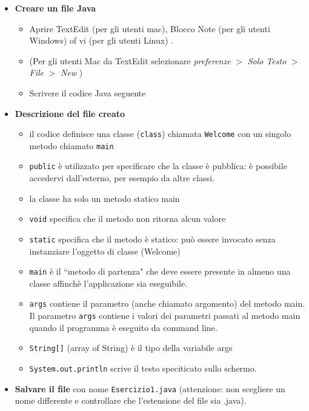 \documentclass{article}
\theoremstyle{definition}
\begin{document}
\begin{itemize}
\item \textbf{Creare un file Java}
\begin{itemize}
\item Aprire  TextEdit (per gli utenti mac), Blocco Note (per gli utenti Windows) of vi (per gli utenti Linux) .
\item (Per gli utenti Mac da TextEdit selezionare \textit{preferenze} $>$ \textit{Solo Testo} $>$ \textit{File} $>$ \textit{New} )
\item Scrivere il codice  Java seguente
\end{itemize}
\end{itemize}

\begin{itemize}
\item \textbf{Descrizione del file creato}
\begin{itemize}
\item il codice definisce una classe (\texttt{class}) chiamata  \texttt{Welcome} con un singolo metodo  chiamato \texttt{main}
\item \texttt{public} \`e utilizzato per specificare che la classe \`e pubblica: \`e possibile accedervi dall'esterno, per esempio da altre classi.
\item la classe ha solo un metodo statico main
\item \texttt{void} specifica che il metodo non ritorna alcun valore
\item \texttt{static} specifica che il metodo \`e statico: pu\`o essere invocato senza instanziare l'oggetto di classe  (Welcome)
\item \texttt{main} \`e il ``metodo di partenza" che deve essere presente in almeno una classe affinch\`e l'applicazione sia eseguibile. 
\item \texttt{args} contiene il parametro (anche chiamato argomento) del metodo main. Il parametro \texttt{args} contiene i valori dei parametri passati al metodo main quando il programma \`e eseguito da command line.
\item \texttt{String[]} (array of String) \`e il tipo della variabile args 
\item \texttt{System.out.println} scrive il testo speciticato sullo schermo.
\end{itemize}
\end{itemize}
\begin{itemize}
\item \textbf{Salvare il file} con nome \texttt{Esercizio1.java} (attenzione: non scegliere un nome differente e controllare che l'estensione del file sia .java).
\end{itemize}
\end{document}
